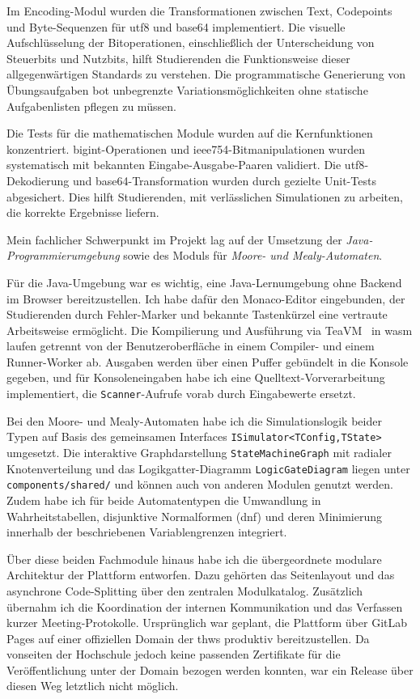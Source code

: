 Im Encoding-Modul wurden die Transformationen zwischen Text, Codepoints und Byte-Sequenzen für \gls{utf8} und \gls{base64} implementiert. Die visuelle Aufschlüsselung der Bitoperationen, einschließlich der Unterscheidung von Steuerbits und Nutzbits, hilft Studierenden die Funktionsweise dieser allgegenwärtigen Standards zu verstehen. Die programmatische Generierung von Übungsaufgaben bot unbegrenzte Variationsmöglichkeiten ohne statische Aufgabenlisten pflegen zu müssen.

Die Tests für die mathematischen Module wurden auf die Kernfunktionen konzentriert. \gls{bigint}-Operationen und \gls{ieee754}-Bitmanipulationen wurden systematisch mit bekannten Eingabe-Ausgabe-Paaren validiert. Die \gls{utf8}-Dekodierung und \gls{base64}-Transformation wurden durch gezielte Unit-Tests abgesichert. Dies hilft Studierenden, mit verlässlichen Simulationen zu arbeiten, die korrekte Ergebnisse liefern.

Mein fachlicher Schwerpunkt im Projekt lag auf der Umsetzung der \emph{Java-Programmierumgebung} sowie des Moduls für \emph{Moore- und Mealy-Automaten}.

Für die Java-Umgebung war es wichtig, eine Java-Lernumgebung ohne Backend im Browser bereitzustellen. Ich habe dafür den Monaco-Editor eingebunden, der Studierenden durch Fehler-Marker und bekannte Tastenkürzel eine vertraute Arbeitsweise ermöglicht. Die Kompilierung und Ausführung via TeaVM~\cite{teavm} in \gls{wasm} laufen getrennt von der Benutzeroberfläche in einem Compiler- und einem Runner-Worker ab. Ausgaben werden über einen Puffer gebündelt in die Konsole gegeben, und für Konsoleneingaben habe ich eine Quelltext-Vorverarbeitung implementiert, die \texttt{Scanner}-Aufrufe vorab durch Eingabewerte ersetzt.

Bei den Moore- und Mealy-Automaten habe ich die Simulationslogik beider Typen auf Basis des gemeinsamen Interfaces \texttt{ISimulator\allowbreak<TConfig,\allowbreak{}TState>} umgesetzt. Die interaktive Graphdarstellung \verb|StateMachineGraph| mit radialer Knotenverteilung und das Logikgatter-Diagramm \verb|LogicGateDiagram| liegen unter \verb|components/shared/| und können auch von anderen Modulen genutzt werden. Zudem habe ich für beide Automatentypen die Umwandlung in Wahrheitstabellen, disjunktive Normalformen (\gls{dnf}) und deren Minimierung innerhalb der beschriebenen Variablengrenzen integriert.

Über diese beiden Fachmodule hinaus habe ich die übergeordnete modulare Architektur der Plattform entworfen. Dazu gehörten das Seitenlayout und das asynchrone Code-Splitting über den zentralen Modulkatalog. Zusätzlich übernahm ich die Koordination der internen Kommunikation und das Verfassen kurzer Meeting-Protokolle. Ursprünglich war geplant, die Plattform über GitLab Pages auf einer offiziellen Domain der \gls{thws} produktiv bereitzustellen. Da vonseiten der Hochschule jedoch keine passenden Zertifikate für die Veröffentlichung unter der Domain bezogen werden konnten, war ein Release über diesen Weg letztlich nicht möglich.
